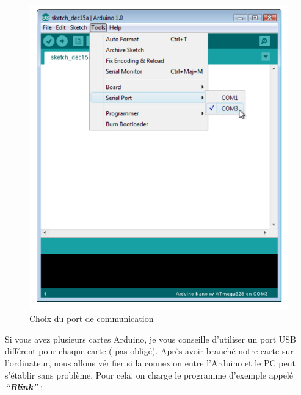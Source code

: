 \documentclass[12pt,a4paper]{article}
\begin{document}
\bigskip
\begin{figure}[h!]
    \centering
    \includegraphics[scale=1.2]{choixport.PNG}
    \caption{Choix du port de communication}
    \label{fig:my_label}
\end{figure}

\newpage

Si vous avez plusieurs cartes Arduino, je vous conseille d’utiliser un port USB différent pour chaque carte ( pas obligé). Après avoir branché notre carte sur l'ordinateur,  nous allons vérifier si la connexion entre l’Arduino et le PC peut s’établir sans problème. 
Pour cela, on charge le programme d’exemple appelé \textit{\textbf{“Blink”}} :
\end{document}
